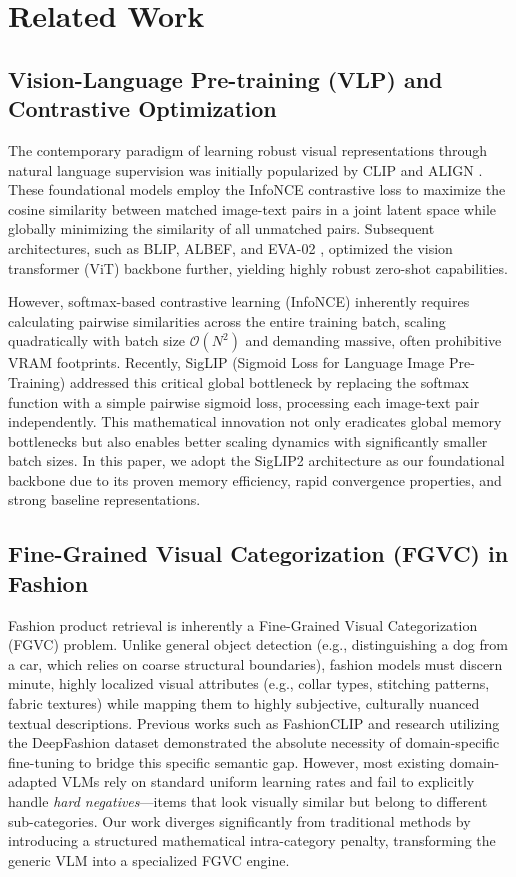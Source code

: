 \documentclass[conference]{IEEEtran}
\begin{document}
\section{Related Work}

\subsection{Vision-Language Pre-training (VLP) and Contrastive Optimization}
The contemporary paradigm of learning robust visual representations through natural language supervision was initially popularized by CLIP \cite{radford2021learning} and ALIGN \cite{jia2021scaling}. These foundational models employ the InfoNCE contrastive loss to maximize the cosine similarity between matched image-text pairs in a joint latent space while globally minimizing the similarity of all unmatched pairs. Subsequent architectures, such as BLIP, ALBEF, and EVA-02 \cite{fang2023eva}, optimized the vision transformer (ViT) backbone further, yielding highly robust zero-shot capabilities. 

However, softmax-based contrastive learning (InfoNCE) inherently requires calculating pairwise similarities across the entire training batch, scaling quadratically with batch size $\mathcal{O}(N^2)$ and demanding massive, often prohibitive VRAM footprints. Recently, SigLIP (Sigmoid Loss for Language Image Pre-Training) \cite{zhai2023sigmoid} addressed this critical global bottleneck by replacing the softmax function with a simple pairwise sigmoid loss, processing each image-text pair independently. This mathematical innovation not only eradicates global memory bottlenecks but also enables better scaling dynamics with significantly smaller batch sizes. In this paper, we adopt the SigLIP2 architecture as our foundational backbone due to its proven memory efficiency, rapid convergence properties, and strong baseline representations.

\subsection{Fine-Grained Visual Categorization (FGVC) in Fashion}
Fashion product retrieval is inherently a Fine-Grained Visual Categorization (FGVC) problem. Unlike general object detection (e.g., distinguishing a dog from a car, which relies on coarse structural boundaries), fashion models must discern minute, highly localized visual attributes (e.g., collar types, stitching patterns, fabric textures) while mapping them to highly subjective, culturally nuanced textual descriptions. Previous works such as FashionCLIP \cite{chia2022fashionclip} and research utilizing the DeepFashion dataset demonstrated the absolute necessity of domain-specific fine-tuning to bridge this specific semantic gap. However, most existing domain-adapted VLMs rely on standard uniform learning rates and fail to explicitly handle \textit{hard negatives}---items that look visually similar but belong to different sub-categories. Our work diverges significantly from traditional methods by introducing a structured mathematical intra-category penalty, transforming the generic VLM into a specialized FGVC engine.
\end{document}
